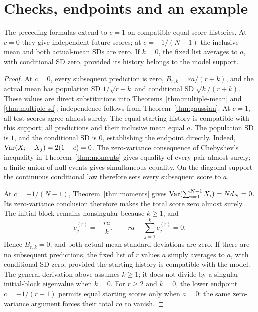 \section{Checks, endpoints and an example}
\begin{proposition}
\label{prop:multiple-boundaries}
The preceding formulas extend to \(c=1\) on compatible equal-score
histories. At \(c=0\) they give independent future scores; at
\(c=-1/(N-1)\) the inclusive mean and both actual-mean SDs are zero.
If \(k=0\), the fixed list averages to \(a\), with conditional SD zero,
provided its history belongs to the model support.
\end{proposition}
\begin{proof}
At \(c=0\), every subsequent prediction is zero,
\(B_{r,k}=ra/(r+k)\), and the actual mean has population SD
\(1/\sqrt{r+k}\) and conditional SD \(\sqrt{k}/(r+k)\).
These values are direct substitutions into Theorems~\ref{thm:multiple-mean}
and \ref{thm:multiple-sd}; independence follows from
Theorem~\ref{thm:gaussian}.
At \(c=1\), all test scores agree almost surely. The equal starting
history is compatible with this support; all predictions and their
inclusive mean equal \(a\). The population SD is \(1\), and the
conditional SD is \(0\), establishing the endpoint directly.
Indeed, \(\operatorname{Var}(X_i-X_j)=2(1-c)=0\). The zero-variance consequence of
Chebyshev's inequality in Theorem~\ref{thm:moments} gives equality of every
pair almost surely; a finite union of null events gives simultaneous
equality. On the diagonal support the continuous conditional law therefore
sets every subsequent score to \(a\).

At \(c=-1/(N-1)\), Theorem~\ref{thm:moments} gives
\(\operatorname{Var}(\sum_{i=0}^{N-1}X_i)=Nd_N=0\). Its zero-variance conclusion
therefore makes the total score zero almost surely. The initial
block remains nonsingular because \(k\geq1\), and
\[
  e_j^{(r)}=-\frac{ra}{k},\qquad
  ra+\sum_{j=1}^{k}e_j^{(r)}=0.
\]
Hence \(B_{r,k}=0\), and both actual-mean standard deviations are zero.
If there are no subsequent predictions, the fixed list of \(r\) values
\(a\) simply averages to \(a\), with conditional SD zero, provided the
starting history is compatible with the model. The general derivation
above assumes \(k\geq1\); it does not divide by a singular initial-block
eigenvalue when \(k=0\).
For \(r\geq2\) and \(k=0\), the lower endpoint \(c=-1/(r-1)\) permits
equal starting scores only when \(a=0\): the same zero-variance argument
forces their total \(ra\) to vanish.
\end{proof}

